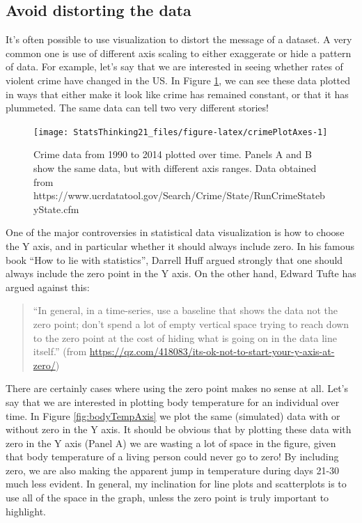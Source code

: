 \documentclass[12pt,]{book}
\theoremstyle{definition}
\theoremstyle{definition}
\theoremstyle{definition}
\theoremstyle{remark}
\begin{document}
\hypertarget{avoid-distorting-the-data}{%
\subsection{Avoid distorting the data}\label{avoid-distorting-the-data}}

It's often possible to use visualization to distort the message of a dataset. A very common one is use of different axis scaling to either exaggerate or hide a pattern of data. For example, let's say that we are interested in seeing whether rates of violent crime have changed in the US. In Figure \ref{fig:crimePlotAxes}, we can see these data plotted in ways that either make it look like crime has remained constant, or that it has plummeted. The same data can tell two very different stories!

\begin{figure}
\texttt{[image: StatsThinking21\_files/figure-latex/crimePlotAxes-1]} \caption{Crime data from 1990 to 2014 plotted over time.  Panels A and B show the same data, but with different axis ranges. Data obtained from https://www.ucrdatatool.gov/Search/Crime/State/RunCrimeStatebyState.cfm}\label{fig:crimePlotAxes}
\end{figure}

One of the major controversies in statistical data visualization is how to choose the Y axis, and in particular whether it should always include zero. In his famous book ``How to lie with statistics'', Darrell Huff argued strongly that one should always include the zero point in the Y axis. On the other hand, Edward Tufte has argued against this:

\begin{quote}
``In general, in a time-series, use a baseline that shows the data not the zero point; don't spend a lot of empty vertical space trying to reach down to the zero point at the cost of hiding what is going on in the data line itself.'' (from \url{https://qz.com/418083/its-ok-not-to-start-your-y-axis-at-zero/})
\end{quote}

There are certainly cases where using the zero point makes no sense at all. Let's say that we are interested in plotting body temperature for an individual over time. In Figure \ref{fig:bodyTempAxis} we plot the same (simulated) data with or without zero in the Y axis. It should be obvious that by plotting these data with zero in the Y axis (Panel A) we are wasting a lot of space in the figure, given that body temperature of a living person could never go to zero! By including zero, we are also making the apparent jump in temperature during days 21-30 much less evident. In general, my inclination for line plots and scatterplots is to use all of the space in the graph, unless the zero point is truly important to highlight.
\end{document}

